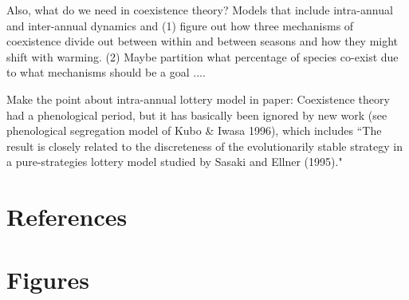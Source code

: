 \documentclass[11pt]{article}
\begin{document}
Also, what do we need in coexistence theory? Models that include intra-annual and inter-annual dynamics and (1) figure out how three mechanisms of coexistence divide out between within and between seasons and how they might shift with warming. (2) Maybe partition what percentage of species co-exist due to what mechanisms should be a goal .... 

Make the point about intra-annual lottery model in paper: Coexistence theory had a phenological period, but it has basically been ignored by new work (see phenological segregation model of Kubo \& Iwasa 1996), which includes ``The result is closely related to the discreteness of the evolutionarily stable strategy in a pure-strategies lottery model studied by Sasaki and Ellner (1995)." 


\newpage
\section{References}


\newpage
\section{Figures}

\end{document}
